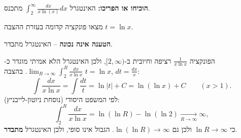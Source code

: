 
\begin{question}
\textbf{הוכיחו או הפריכו:} האינטגרל $\int_2^\infty \frac{dx}{x\ln(x)}dx$ מתכנס.
\end{question}

\begin{hint}
מצאו פונקציה קדומה בעזרת ההצבה $t=\ln x$.
\end{hint}

\begin{solution}
\textbf{הטענה אינה נכונה} -- האינטגרל מתבדר.

הפונקציה $\frac{1}{x\ln x}$ רציפה וחיובית ב-$[2,\infty)$, ולכן האינטגרל הלא אמיתי מוגדר כ-$\lim_{R\to\infty}\int_2^R\frac{dx}{x\ln x}$.
בהצבה $t=\ln x$, $dt=\frac{dx}{x}$:
\[ \int\frac{dx}{x\ln x}=\int\frac{dt}{t}=\ln|t|+C=\ln(\ln x)+C \qquad (x>1). \]
לפי המשפט היסודי (נוסחת ניוטון-לייבניץ):
\[ \int_2^R\frac{dx}{x\ln x}=\ln(\ln R)-\ln(\ln 2)\xrightarrow[R\to\infty]{}\infty, \]
כי $\ln R\to\infty$ ולכן גם $\ln(\ln R)\to\infty$. הגבול אינו סופי, ולכן האינטגרל \textbf{מתבדר}.
\end{solution}
